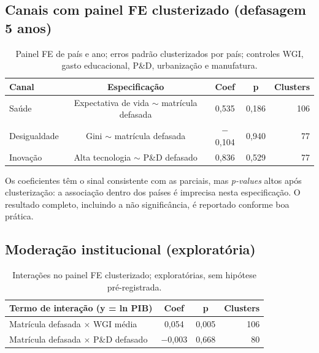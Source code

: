 \documentclass[12pt,a4paper]{article}
\begin{document}
\subsection{Canais com painel FE clusterizado (defasagem 5 anos)}

\begin{table}[h!]
\centering
\small
\begin{tabular}{lcccr}
\toprule
\textbf{Canal} & \textbf{Especificação} & \textbf{Coef} & \textbf{p} & \textbf{Clusters} \\
\midrule
Saúde & Expectativa de vida $\sim$ matrícula defasada & 0,535 & 0,186 & 106 \\
Desigualdade & Gini $\sim$ matrícula defasada & $-$0,104 & 0,940 & 77 \\
Inovação & Alta tecnologia $\sim$ P\&D defasado & 0,836 & 0,529 & 77 \\
\bottomrule
\end{tabular}
\caption{Painel FE de país e ano; erros padrão clusterizados por país; controles WGI, gasto educacional, P\&D, urbanização e manufatura.}
\end{table}

Os coeficientes têm o sinal consistente com as parciais, mas \emph{p-values} altos após clusterização: a associação dentro dos países é imprecisa nesta especificação. O resultado completo, incluindo a não significância, é reportado conforme boa prática.

\subsection{Moderação institucional (exploratória)}

\begin{table}[h!]
\centering
\small
\begin{tabular}{lccr}
\toprule
\textbf{Termo de interação (y = ln PIB)} & \textbf{Coef} & \textbf{p} & \textbf{Clusters} \\
\midrule
Matrícula defasada $\times$ WGI média & 0,054 & 0,005 & 106 \\
Matrícula defasada $\times$ P\&D defasado & $-$0,003 & 0,668 & 80 \\
\bottomrule
\end{tabular}
\caption{Interações no painel FE clusterizado; exploratórias, sem hipótese pré-registrada.}
\end{table}

\end{document}
